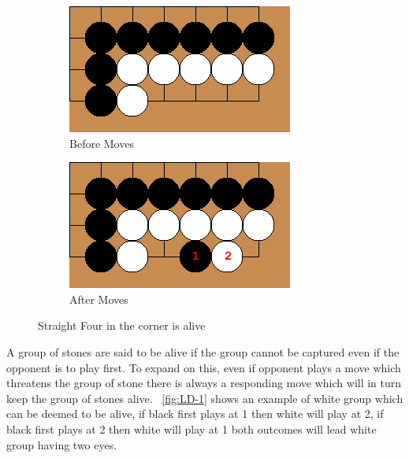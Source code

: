\documentclass{l4proj}
\begin{document}
\begin{figure}[!ht]
\centering
\begin{subfigure}[b]{0.45\textwidth}
\includegraphics[width=\textwidth]{LD/1a.png}
\caption{Before Moves}
\label{fig:LD-1a}
\end{subfigure}\qquad
\begin{subfigure}[b]{0.45\textwidth}
\includegraphics[width=\textwidth]{LD/1b.png}
\caption{After Moves}
\label{fig:LD-1b}
\end{subfigure}
\caption{Straight Four in the corner is alive}
\label{fig:LD-1}
\end{figure}

A group of stones are said to be alive if the group cannot be captured even if the opponent is to play first. To expand on this, even if opponent plays a move which threatens the group of stone there is always a responding move which will in turn keep the group of stones alive. ~\autoref{fig:LD-1} shows an example of white group which can be deemed to be alive, if black first plays at 1 then white will play at 2, if black first plays at 2 then white will play at 1 both outcomes will lead white group having two eyes.
\end{document}
